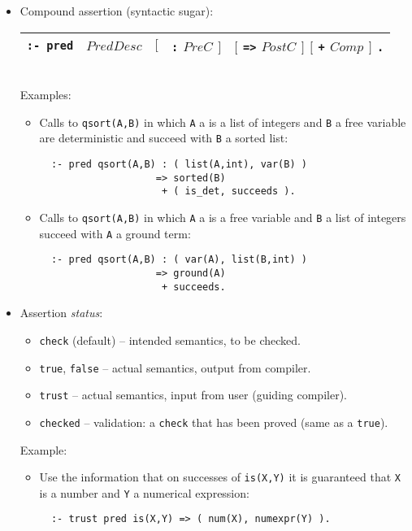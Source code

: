 \documentclass{article}
\renewcommand{\_}{\char'137}
\begin{document}
\begin{itemize}
\item Compound assertion (syntactic sugar):

\begin{tabular}{|lllll|}
\hline
{\tt :- pred}    & $PredDesc$ & $[$ & {\tt :} $PreC$ $]$ & $[$ {\tt =>} $PostC$ $]$ $[$ {\tt +} $Comp$ $]$ {\tt .}\\ [2mm]
\hline
\end{tabular} \\

Examples:
\begin{itemize}
  \item Calls to \verb+qsort(A,B)+ in which \verb+A+ a is a list of
  integers and \verb+B+ a free variable are deterministic and succeed
  with \verb+B+ a sorted list:
 \begin{verbatim}
  :- pred qsort(A,B) : ( list(A,int), var(B) )
                    => sorted(B) 
                     + ( is_det, succeeds ).
\end{verbatim}
  \item Calls to \verb+qsort(A,B)+ in which \verb+A+ a is a free variable
  and \verb+B+ a list of integers succeed with \verb+A+ a ground term:
 \begin{verbatim}
  :- pred qsort(A,B) : ( var(A), list(B,int) )
                    => ground(A) 
                     + succeeds. 
\end{verbatim}
\end{itemize}

\item Assertion {\em status}: 
\begin{itemize}
\item {\tt check} (default) -- intended semantics, to be checked.
\item {\tt true}, {\tt false} -- actual semantics, output from compiler.
\item {\tt trust} -- actual semantics, input from user (guiding compiler).
\item {\tt checked} -- validation: a {\tt check} that has been proved
  (same as a {\tt true}).
\end{itemize}

Example:
\begin{itemize}
\item Use the information that on successes of \verb+is(X,Y)+ it is
  guaranteed that \verb+X+ is a number and \verb+Y+ a numerical expression:
\begin{verbatim}
  :- trust pred is(X,Y) => ( num(X), numexpr(Y) ).
\end{verbatim}
\end{itemize}


\end{itemize}
\end{document}
